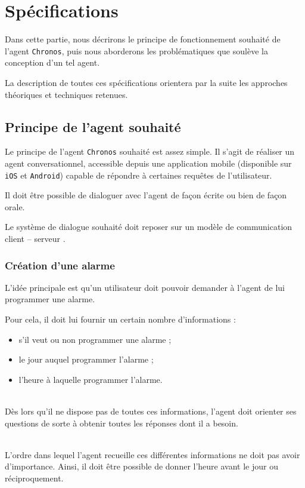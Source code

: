 \chapter{Spécifications}

Dans cette partie, nous décrirons le principe de fonctionnement souhaité de l'agent \texttt{Chronos}, puis nous aborderons les problématiques que soulève la conception d'un tel agent.

La description de toutes ces spécifications orientera par la suite les approches théoriques et techniques retenues.


\section{Principe de l'agent souhaité}
Le principe de l'agent \texttt{Chronos} souhaité est assez simple. Il s'agit de réaliser un agent conversationnel, accessible depuis une application mobile (disponible sur \texttt{iOS} et \texttt{Android}) capable de répondre à certaines requêtes de l'utilisateur. 

Il doit être possible de dialoguer avec l'agent de façon écrite ou bien de façon orale. 

Le système de dialogue souhaité doit reposer sur un modèle de communication \og client \--- serveur \fg.

\subsection{Création d'une alarme}
L'idée principale est qu'un utilisateur doit pouvoir demander à l'agent de lui programmer une alarme. 

Pour cela, il doit lui fournir un certain nombre d'informations :
\begin{itemize}
    \item s'il veut ou non programmer une alarme ;
    \item le jour auquel programmer l'alarme ;
    \item l'heure à laquelle programmer l'alarme.
\end{itemize}

~\\\indent
Dès lors qu'il ne dispose pas de toutes ces informations, l'agent doit orienter ses questions de sorte à obtenir toutes les réponses dont il a besoin.

~\\\indent 
L'ordre dans lequel l'agent recueille ces différentes informations ne doit pas avoir d'importance. Ainsi, il doit être possible de donner l'heure avant le jour ou réciproquement.

